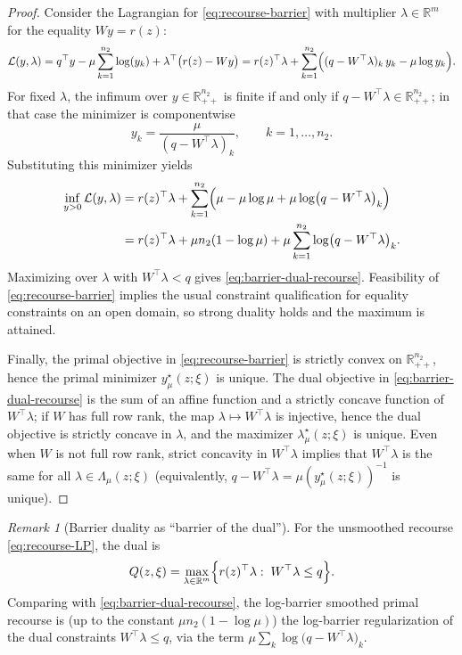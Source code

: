 \documentclass[11pt]{article}
\theoremstyle{plain}
\theoremstyle{definition}
\theoremstyle{remark}
\newtheorem{remark}[theorem]{Remark}
\begin{document}
\begin{proof}
Consider the Lagrangian for \eqref{eq:recourse-barrier} with multiplier $\lambda\in\mathbb{R}^m$ for
the equality $Wy=r(z)$:
\[
\mathcal{L}(y,\lambda)
= q^\top y-\mu\sum_{k=1}^{n_2}\log(y_k)+\lambda^\top\bigl(r(z)-Wy\bigr)
= r(z)^\top\lambda + \sum_{k=1}^{n_2}\Bigl((q-W^\top\lambda)_k\,y_k-\mu\log y_k\Bigr).
\]
For fixed $\lambda$, the infimum over $y\in\mathbb{R}^{n_2}_{++}$ is finite if and only if
$q-W^\top\lambda\in\mathbb{R}^{n_2}_{++}$; in that case the minimizer is componentwise
\[
y_k=\frac{\mu}{(q-W^\top\lambda)_k},\qquad k=1,\dots,n_2.
\]
Substituting this minimizer yields
\[
\begin{aligned}
\inf_{y>0}\mathcal{L}(y,\lambda)
&= r(z)^\top\lambda + \sum_{k=1}^{n_2}\Bigl(\mu-\mu\log\mu+\mu\log\bigl(q-W^\top\lambda\bigr)_k\Bigr)\\
&= r(z)^\top\lambda+\mu n_2(1-\log\mu)
+\mu\sum_{k=1}^{n_2}\log\bigl(q-W^\top\lambda\bigr)_k.
\end{aligned}
\]
Maximizing over $\lambda$ with $W^\top\lambda<q$ gives \eqref{eq:barrier-dual-recourse}.
Feasibility of \eqref{eq:recourse-barrier} implies the usual constraint qualification for equality constraints
on an open domain, so strong duality holds and the maximum is attained.

Finally, the primal objective in \eqref{eq:recourse-barrier} is strictly convex on $\mathbb{R}^{n_2}_{++}$,
hence the primal minimizer $y_\mu^\star(z;\xi)$ is unique. The dual objective in \eqref{eq:barrier-dual-recourse}
is the sum of an affine function and a strictly concave function of $W^\top\lambda$; if $W$ has full row rank,
the map $\lambda\mapsto W^\top\lambda$ is injective, hence the dual objective is strictly concave in $\lambda$,
and the maximizer $\lambda_\mu^\star(z;\xi)$ is unique.
Even when $W$ is not full row rank, strict concavity in $W^\top\lambda$ implies that $W^\top\lambda$ is the same
for all $\lambda\in\Lambda_\mu(z;\xi)$ (equivalently, $q-W^\top\lambda=\mu(y_\mu^\star(z;\xi))^{-1}$ is unique).
\end{proof}

\begin{remark}[Barrier duality as ``barrier of the dual'']\label{rem:barrier-of-dual}
For the unsmoothed recourse \eqref{eq:recourse-LP}, the dual is
\[
Q(z,\xi)=\max_{\lambda\in\mathbb{R}^m}\Bigl\{r(z)^\top\lambda:\;W^\top\lambda\le q\Bigr\}.
\]
Comparing with \eqref{eq:barrier-dual-recourse}, the log-barrier smoothed primal recourse is (up to the
constant $\mu n_2(1-\log\mu)$) the log-barrier regularization of the dual constraints $W^\top\lambda\le q$,
via the term $\mu\sum_k\log\bigl(q-W^\top\lambda\bigr)_k$.
\end{remark}
\end{document}
